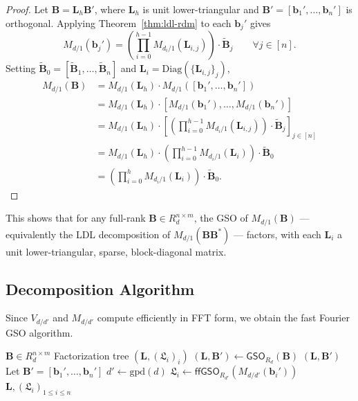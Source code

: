 \begin{proof}
	Let $\mathbf{B} = \mathbf{L}_h \mathbf{B}'$, where $\mathbf{L}_h$ is unit lower-triangular and $\mathbf{B}' = [\mathbf{b}_1', \dots, \mathbf{b}_n']$ is orthogonal. Applying Theorem~\ref{thm:ldl-rdm} to each $\mathbf{b}_j'$ gives
	\[
		M_{d/1}(\mathbf{b}_j') = \left( \prod_{i=0}^{h-1} M_{d_i/1}(\mathbf{L}_{i,j}) \right) \cdot \tilde{\mathbf{B}}_j \qquad \forall j \in [n].
	\]
	Setting $\tilde{\mathbf{B}}_0 = [\tilde{\mathbf{B}}_1, \dots, \tilde{\mathbf{B}}_n]$ and $\mathbf{L}_i = \mathrm{Diag}(\{\mathbf{L}_{i,j}\}_j)$,
	\begin{align*}
		M_{d/1}(\mathbf{B})
		&= M_{d/1}(\mathbf{L}_h) \cdot M_{d/1}([\mathbf{b}_1', \dots, \mathbf{b}_n']) \\
		&= M_{d/1}(\mathbf{L}_h) \cdot [M_{d/1}(\mathbf{b}_1'), \dots, M_{d/1}(\mathbf{b}_n')] \\
		&= M_{d/1}(\mathbf{L}_h) \cdot \left[ \left( \prod_{i=0}^{h-1} M_{d_i/1}(\mathbf{L}_{i,j}) \right) \cdot \tilde{\mathbf{B}}_j \right]_{j \in [n]} \\
		&= M_{d/1}(\mathbf{L}_h) \cdot \left( \prod_{i=0}^{h-1} M_{d_i/1}(\mathbf{L}_i) \right) \cdot \tilde{\mathbf{B}}_0 \\
		&= \left( \prod_{i=0}^{h} M_{d_i/1}(\mathbf{L}_i) \right) \cdot \tilde{\mathbf{B}}_0.
	\end{align*}
\end{proof}

This shows that for any full-rank $\mathbf{B} \in R_d^{n \times m}$, the GSO of $M_{d/1}(\mathbf{B})$ — equivalently the LDL decomposition of $M_{d/1}(\mathbf{BB}^*)$ — factors, with each $\mathbf{L}_i$ a unit lower-triangular, sparse, block-diagonal matrix.

\subsection{Decomposition Algorithm}

Since $V_{d/d'}$ and $M_{d/d'}$ compute efficiently in FFT form, we obtain the fast Fourier GSO algorithm.

\begin{algorithm}[H]
	\caption{$\mathsf{ffGSO}(\mathbf{B} \in R_d^{n \times m})$}
	\label{alg:ffgso}
	\begin{algorithmic}[1]
		\Require $\mathbf{B} \in R_d^{n \times m}$
		\Ensure Factorization tree $(\mathbf{L}, (\mathfrak{L}_i)_i)$
		\State $(\mathbf{L}, \mathbf{B}') \gets \mathsf{GSO}_{R_d}(\mathbf{B})$
			\State \Return $(\mathbf{L}, \mathbf{B}')$
		\EndIf
		\State Let $\mathbf{B}' = [\mathbf{b}_1', \dots, \mathbf{b}_n']$
		\State $d' \gets \mathrm{gpd}(d)$
			\State $\mathfrak{L}_i \gets \mathsf{ffGSO}_{R_{d'}}(M_{d/d'}(\mathbf{b}_i'))$
		\EndFor
		\State \Return $\mathbf{L}, (\mathfrak{L}_i)_{1 \leq i \leq n}$
	\end{algorithmic}
\end{algorithm}

